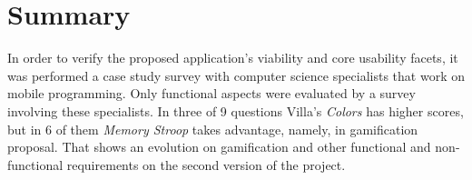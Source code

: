 {%
}
\section{Summary}

In order to verify the proposed application's viability and core usability facets, it was performed a case study survey with computer science specialists that work on mobile programming. Only functional aspects were evaluated by a survey involving these specialists. In three of 9 questions Villa's \textit{Colors} has higher scores, but in 6 of them \textit{Memory Stroop} takes advantage, namely, in gamification proposal. That shows an evolution on gamification and other functional and non-functional requirements on the second version of the project.